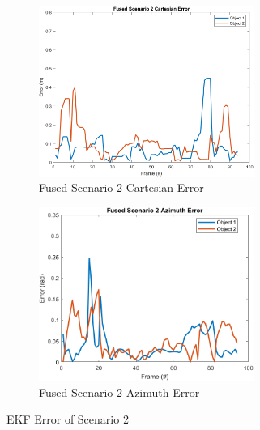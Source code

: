 \begin{figure}[!htb]
    \hspace{0.1\textwidth}
    \begin{subfigure}[b]{0.35\textwidth}%
        \includegraphics[width=7cm]{Figures/matlab/Fused Scenario 2 Cartesian Error.png}
        \caption{Fused Scenario 2 Cartesian Error}
        \label{subfig:err_cart_2}
    \end{subfigure}
    \hspace{0.15\textwidth}
    \begin{subfigure}[b]{0.35\textwidth}%
        \includegraphics[width=7cm]{Figures/matlab/Fused Scenario 2 Azimuth Error.png}
        \caption{Fused Scenario 2 Azimuth Error}
        \label{subfig:err_azi2}
    \end{subfigure}

    \caption{EKF Error of Scenario 2}
    \label{fig:error_2}
\end{figure}
